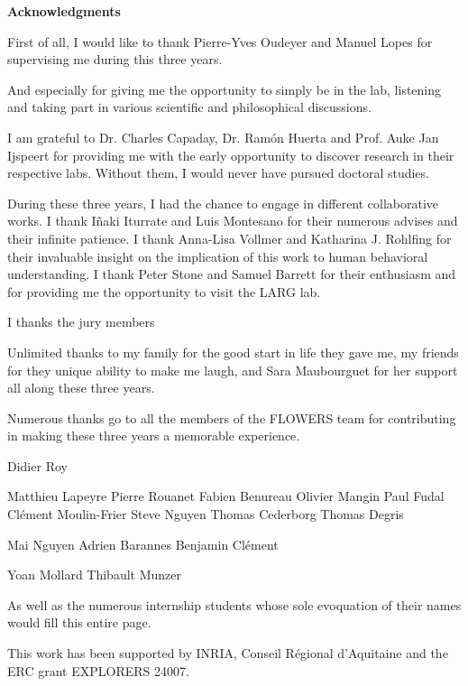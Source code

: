 
\begin{vcenterpage}
\begin{center}
{\large\textbf{Acknowledgments\\}}
\end{center}



First of all, I would like to thank Pierre-Yves Oudeyer and Manuel Lopes for supervising me during this three years. 

And especially for giving me the opportunity to simply be in the lab, listening and taking part in various scientific and philosophical discussions.

I am grateful to Dr. Charles Capaday, Dr. Ram\'{o}n Huerta and Prof. Auke Jan Ijspeert for providing me with the early opportunity to discover research in their respective labs. Without them, I would never have pursued doctoral studies.

During these three years, I had the chance to engage in different collaborative works. I thank I{\~n}aki Iturrate and Luis Montesano for their numerous advises and their infinite patience. I thank Anna-Lisa Vollmer and Katharina J. Rohlfing for their invaluable insight on the implication of this work to human behavioral understanding. I thank Peter Stone and Samuel Barrett for their enthusiasm and for providing me the opportunity to visit the LARG lab.

I thanks the jury members 

Unlimited thanks to my family for the good start in life they gave me, my friends for they unique ability to make me laugh, and Sara Maubourguet for her support all along these three years.

Numerous thanks go to all the members of the \textsc{FLOWERS} team for contributing in making these three years a memorable experience. 

Didier Roy

Matthieu Lapeyre
Pierre Rouanet
Fabien Benureau
Olivier Mangin
Paul Fudal
Cl\'{e}ment Moulin-Frier
Steve Nguyen
Thomas Cederborg
Thomas Degris


Mai Nguyen
Adrien Barannes
Benjamin Cl\'{e}ment

Yoan Mollard
Thibault Munzer



As well as the numerous internship students whose sole evoquation of their names would fill this entire page.


This work has been supported by INRIA, Conseil R\'egional d'Aquitaine and the ERC grant EXPLORERS 24007.

 

\end{vcenterpage}